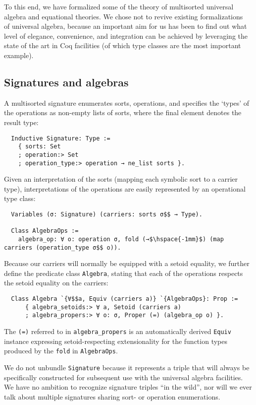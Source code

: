 \documentclass[a4paper,10pt,runningheads]{llncs}
\begin{document}
To this end, we have formalized some of the theory of multisorted universal algebra and equational theories. We chose not to revive existing formalizations~\cite{DBLP:conf/tphol/Capretta99,dominguez2008formalizing} of universal algebra, because an important aim for us has been to find out what level of elegance, convenience, and integration can be achieved by leveraging the state of the art in Coq facilities (of which type classes are the most important example).

\subsection{Signatures and algebras}

A multisorted signature enumerates sorts, operations, and specifies the `types' of the operations as non-empty lists of sorts, where the final element denotes the result type:
\begin{lstlisting}
  Inductive Signature: Type :=
    { sorts: Set
    ; operation:> Set
    ; operation_type:> operation → ne_list sorts }.
\end{lstlisting}
Given an interpretation of the sorts (mapping each symbolic sort to a carrier type), interpretations of the operations are easily represented by an operational type class:
\begin{lstlisting}
  Variables (σ: Signature) (carriers: sorts σ$$ → Type).

  Class AlgebraOps :=
    algebra_op: ∀ o: operation σ, fold (→$\hspace{-1mm}$) (map carriers (operation_type σ$$ o)).
\end{lstlisting}
Because our carriers will normally be equipped with a setoid equality, we further define the predicate class \lstinline|Algebra|, stating that each of the operations respects the setoid equality on the carriers:
\begin{lstlisting}
  Class Algebra `{∀$$a, Equiv (carriers a)} `{AlgebraOps}: Prop :=
      { algebra_setoids:> ∀ a, Setoid (carriers a)
      ; algebra_propers:> ∀ o: σ, Proper (=) (algebra_op o) }.
\end{lstlisting}
The \lstinline|(=)| referred to in \lstinline|algebra_propers| is an automatically derived \lstinline|Equiv| instance expressing setoid-respecting extensionality for the function types produced by the \lstinline|fold| in \lstinline|AlgebraOps|.

We do not unbundle \lstinline|Signature| because it represents a triple that will always be specifically constructed for subsequent use with the universal algebra facilities. We have no ambition to recognize signature triples ``in the wild'', nor will we ever talk about multiple signatures sharing sort- or operation enumerations.
\end{document}
